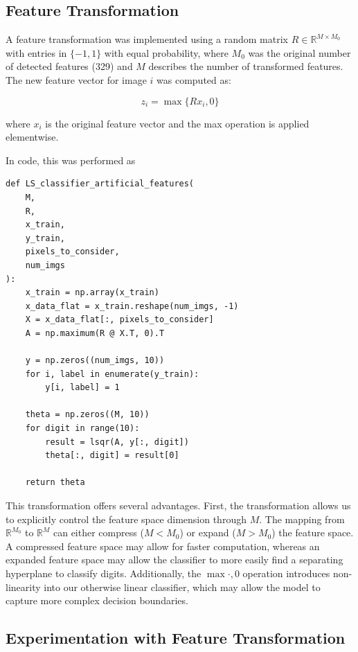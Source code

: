 \documentclass[conference]{IEEEtran}
\begin{document}
\subsection{Feature Transformation}
A feature transformation was implemented using a random matrix $R \in \mathbb{R}^{M \times M_0}$ with entries in $\{-1,1\}$ with equal probability, where $M_0$ was the original number of detected features (329) and $M$ describes the number of transformed features. The new feature vector for image $i$ was computed as:

$$z_i = \max\{Rx_i, 0\}$$

where $x_i$ is the original feature vector and the max operation is applied elementwise.

In code, this was performed as
\begin{verbatim}
def LS_classifier_artificial_features(
    M,
    R,
    x_train,
    y_train,
    pixels_to_consider,
    num_imgs
):
    x_train = np.array(x_train)
    x_data_flat = x_train.reshape(num_imgs, -1)
    X = x_data_flat[:, pixels_to_consider]
    A = np.maximum(R @ X.T, 0).T

    y = np.zeros((num_imgs, 10))
    for i, label in enumerate(y_train):
        y[i, label] = 1
    
    theta = np.zeros((M, 10))
    for digit in range(10):
        result = lsqr(A, y[:, digit])
        theta[:, digit] = result[0]

    return theta

\end{verbatim}

This transformation offers several advantages. First, the transformation allows us to explicitly control the feature space dimension through $M$. The mapping from $\mathbb{R}^{M_0}$ to $\mathbb{R}^M$ can either compress ($M < M_0$) or expand ($M > M_0$) the feature space. A compressed feature space may allow for faster computation, whereas an expanded feature space may allow the classifier to more easily find a separating hyperplane to classify digits. Additionally, the $\max{\cdot,0}$ operation introduces non-linearity into our otherwise linear classifier, which may allow the model to capture more complex decision boundaries.

\subsection{Experimentation with Feature Transformation}
\end{document}
